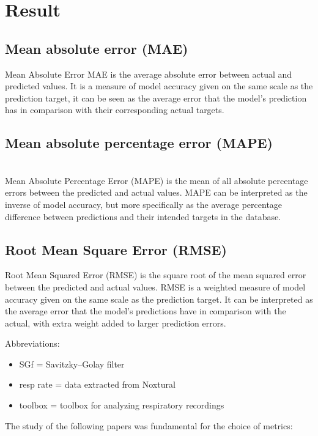 \chapter{Result}

\section{Mean absolute error (MAE)}
Mean Absolute Error MAE is the average absolute error between actual and predicted values.  It is a measure of model accuracy given on the same scale as the prediction target, it can be seen as the average error that the model's prediction has in comparison with their corresponding actual targets.


\section {Mean absolute percentage error (MAPE)} \\
Mean Absolute Percentage Error (MAPE) is the mean of all absolute percentage errors between the predicted and actual values.
MAPE can be interpreted as the inverse of model accuracy, but more specifically as the average percentage difference between predictions and their intended targets in the database.


 \section{Root Mean Square Error (RMSE) }
 Root Mean Squared Error (RMSE) is the square root of the mean squared error between the predicted and actual values.
 RMSE is a weighted measure of model accuracy given on the same scale as the prediction target. It can be interpreted as the average error that the model’s predictions have in comparison with the actual, with extra weight added to larger prediction errors.
 
 Abbreviations:
\begin{itemize}
    \item SGf = Savitzky–Golay filter
    \item resp rate = data extracted from Noxtural
    \item toolbox = toolbox for analyzing respiratory recordings \cite{Noto2018AutomatedToolbox}
\end{itemize}

The study of the following papers was fundamental for the choice of metrics:
    \cite{Hunt2015IdentificationExercise} \cite{HoogAntink2020BallistocardiographyIntervention} 
    \cite{SadekAStudy}
    
